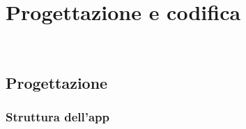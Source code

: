 \chapter{Progettazione e codifica}
\label{cap:progettazione-codifica}



\\

\section{Progettazione}
\label{sec:progettazione}

\subsection{Struttura dell'app}

